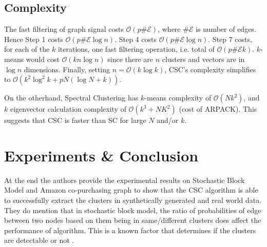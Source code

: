 \documentclass[10pt,a4paper,twoside]{report}
\theoremstyle{definition}
\begin{document}
	\section{Complexity}
	The fast filtering of graph signal costs $\mathcal{O}(p\#\mathcal{E})$, where $\#\mathcal{E}$ is number of edges. Hence Step 1 costs $\mathcal{O}(p\#\mathcal{E}\log n)$. Step 4 costs $\mathcal{O}(p\#\mathcal{E}\log n)$. Step 7 costs, for each of the $k$ iterations, one fast filtering operation, i.e. total of $\mathcal{O}(p\#\mathcal{E}k)$. $k$-means would cost $\mathcal{O}(kn \log n)$ since there are $n$ clusters and vectors are in $\log n$ dimensions. Finally, setting $n=\mathcal{O}(k \log k)$, CSC's complexity simplifies to $\mathcal{O}(k^2\log^2k+pN(\log N +k))$. 

	On the otherhand, Spectral Clustering has $k$-means complexity of $\mathcal{O}(Nk^2)$, and $k$ eigenvector calculation complexity of $\mathcal{O}(k^3 + NK^2)$ (cost of ARPACK). This suggests that CSC is faster than SC for large $N$ and/or $k$.

	\chapter{Experiments \& Conclusion}
	At the end the authors provide the experimental results on Stochastic Block Model and Amazon co-purchasing graph to show that the CSC algorithm is able to successfully extract the clusters in synthetically generated and real world data. They do mention that in stochastic block model, the ratio of probabilities of edge between two nodes based on them being in same/different clusters does affect the performance of algorithm. This is a known factor that determines if the clusters are detectable or not \cite{decelle-2011}.

	\thispagestyle{fancy}
	
	 

	\nocite{govl:96, parlet:98, stsu:90, gene:2018}
\end{document}
